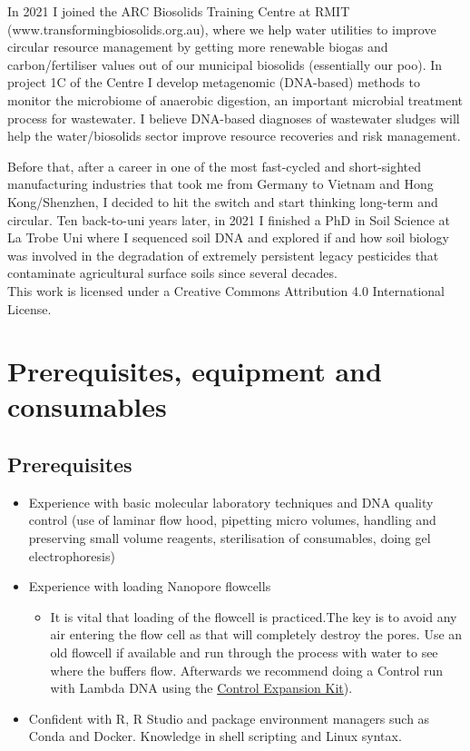 \documentclass[
]{book}
\providecommand{\tightlist}{%
  \setlength{\itemsep}{0pt}\setlength{\parskip}{0pt}}
\begin{document}
In 2021 I joined the ARC Biosolids Training Centre at RMIT (www.transformingbiosolids.org.au), where we help water utilities to improve circular resource management by getting more renewable biogas and carbon/fertiliser values out of our municipal biosolids (essentially our poo). In project 1C of the Centre I develop metagenomic (DNA-based) methods to monitor the microbiome of anaerobic digestion, an important microbial treatment process for wastewater. I believe DNA-based diagnoses of wastewater sludges will help the water/biosolids sector improve resource recoveries and risk management.

Before that, after a career in one of the most fast-cycled and short-sighted manufacturing industries that took me from Germany to Vietnam and Hong Kong/Shenzhen, I decided to hit the switch and start thinking long-term and circular. Ten back-to-uni years later, in 2021 I finished a PhD in Soil Science at La Trobe Uni where I sequenced soil DNA and explored if and how soil biology was involved in the degradation of extremely persistent legacy pesticides that contaminate agricultural surface soils since several decades.\\

This work is licensed under a Creative Commons Attribution 4.0 International License.

\chapter{Prerequisites, equipment and consumables}\label{prerequisites}

\section{Prerequisites}\label{prerequisites-1}

\begin{itemize}
\tightlist
\item
  Experience with basic molecular laboratory techniques and DNA quality control (use of laminar flow hood, pipetting micro volumes, handling and preserving small volume reagents, sterilisation of consumables, doing gel electrophoresis)
\item
  Experience with loading Nanopore flowcells

  \begin{itemize}
  \tightlist
  \item
    It is vital that loading of the flowcell is practiced.The key is to avoid any air entering the flow cell as that will completely destroy the pores. Use an old flowcell if available and run through the process with water to see where the buffers flow. Afterwards we recommend doing a Control run with Lambda DNA using the \href{https://store.nanoporetech.com/control-expansion.html}{Control Expansion Kit}).
  \end{itemize}
\item
  Confident with R, R Studio and package environment managers such as Conda and Docker. Knowledge in shell scripting and Linux syntax.
\end{itemize}
\end{document}
